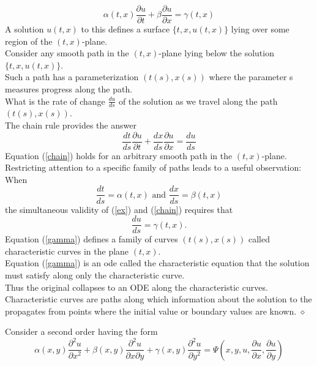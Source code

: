 \begin{example}
\begin{equation}\label{ex}
\alpha(t,x)\frac{\partial u}{\partial t}+\beta\frac{\partial u}{\partial x}=\gamma(t,x)\end{equation}
A solution $u(t,x)$ to this  defines a surface $\{t,x,u(t,x)\}$ lying over some region of the $(t,x)$-plane.\\
Consider any smooth path in the $(t,x)$-plane lying below the solution $\{t,x,u(t,x)\}$.\\  Such a path has a parameterization $(t(s),x(s))$ where the parameter
s measures progress along the path.\\
What is the rate of change $\frac{d u}{d s}$ of the solution as we travel along the path $(t(s),x(s))$.\\
The chain rule provides the answer
\begin{equation}\label{chain}\frac{d t}{d s}\frac{\partial u}{\partial t}+
\frac{d x}{d s}\frac{\partial u}{\partial x}
=\frac{d u}{d s}\end{equation}
Equation (\ref{chain}) holds for an arbitrary smooth path in the $(t,x)$-plane.  
Restricting attention to a specific family of paths leads to a useful observation:
When
\begin{equation}\frac{dt}{ds}=\alpha(t,x) \mbox{  and  } \frac{dx}{ds}=\beta(t,x)
\end{equation}
the simultaneous validity of (\ref{ex}) and (\ref{chain}) requires that
\begin{equation}\label{gamma}
\frac{du}{ds}=\gamma(t,x).
\end{equation}
Equation (\ref{gamma}) defines a family of curves $(t(s),x(s))$ called characteristic curves in the plane $(t,x)$.\\
Equation (\ref{gamma}) is an ode called the characteristic equation that the solution must satisfy along only the characteristic curve.\\
Thus the original  collapses to an ODE along the characteristic curves. Characteristic 
curves are paths along which information about the solution to the  propagates
from points where the initial value or boundary values are known.
$\diamond$\end{example}
Consider a second order  having the form
\begin{equation}
\alpha(x,y)\frac{\partial^2u}{\partial x^2}+\beta(x,y)\frac{\partial^2 u}{\partial x\partial y}+\gamma(x,y)\frac{\partial^2u}{\partial y^2} = \Psi(x,y,u,\frac{\partial u}{\partial x},\frac{\partial u }{\partial y})
\end{equation}
